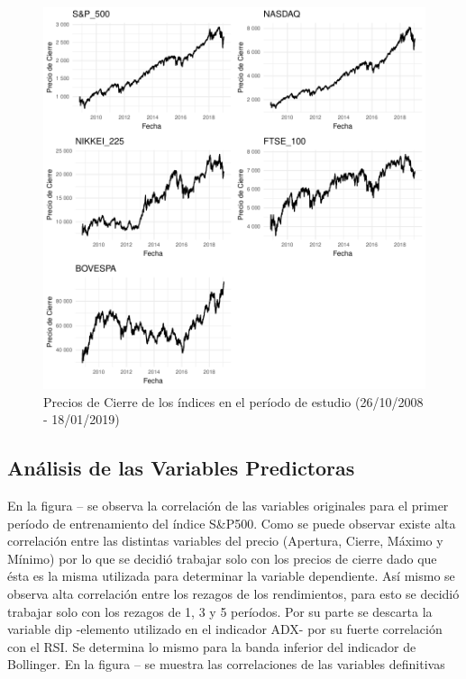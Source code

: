 \documentclass[a4paper,12pt]{Latex/Classes/PhDthesisPSnPDF}
\begin{document}
\begin{figure}[H]
\centering
\includegraphics{main-005}
\caption{Precios de Cierre de los índices en el período de estudio (26/10/2008 - 18/01/2019)}
\end{figure}


\subsection{Análisis de las Variables Predictoras}

En la figura -- se observa la correlación de las variables originales para el primer período de entrenamiento del índice S\&P500. Como se puede observar existe alta correlación entre las distintas variables del precio (Apertura, Cierre, Máximo y Mínimo) por lo que se decidió trabajar solo con los precios de cierre dado que ésta es la misma utilizada para determinar la variable dependiente. Así mismo se observa alta correlación entre los rezagos de los rendimientos, para esto se decidió trabajar solo con los rezagos de 1, 3 y 5 períodos. Por su parte se descarta la variable dip -elemento utilizado en el indicador ADX- por su fuerte correlación con el RSI. Se determina lo mismo para la banda inferior del indicador de Bollinger. En la figura -- se muestra las correlaciones de las variables definitivas
\end{document}
